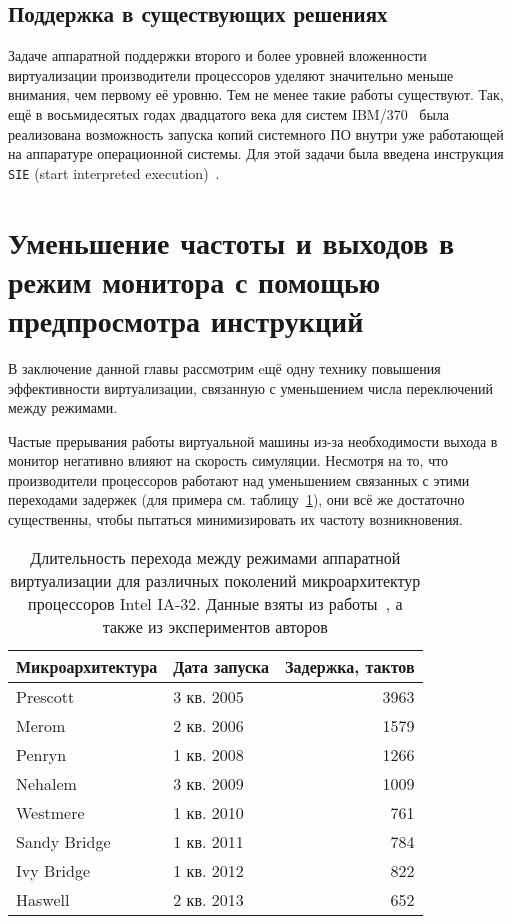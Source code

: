 \subsection{Поддержка в существующих решениях}

Задаче аппаратной поддержки второго и более уровней вложенности виртуализации производители процессоров уделяют значительно меньше внимания, чем первому её уровню. Тем не менее такие работы существуют. Так, ещё в восьмидесятых годах двадцатого века для систем IBM/370~\cite{Osisek:1991:EIA:106229.120150} была реализована возможность запуска копий системного ПО внутри уже работающей на аппаратуре операционной системы. Для этой задачи была введена инструкция \texttt{SIE} (\abbr start interpreted execution)~\cite{sie-comp-arch}.

\section[Уменьшение частоты и выходов в монитор]{Уменьшение частоты и выходов в режим монитора с помощью предпросмотра инструкций}\label{sec:software-prescan}

В заключение данной главы рассмотрим eщё одну технику повышения эффективности виртуализации, связанную с уменьшением числа переключений между режимами.

Частые прерывания работы виртуальной машины из-за необходимости выхода в монитор негативно влияют на скорость симуляции.  Несмотря на то, что производители процессоров работают над уменьшением связанных с этими переходами задержек (для примера см. таблицу~\ref{tab:vmexit-latency}), они всё же достаточно существенны, чтобы пытаться минимизировать их частоту возникновения.

\begin{table}[htb]
\centering
\begin{tabular}{|l|l|r|}\hline
\textbf{Микроархитектура} & \textbf{Дата запуска} & \textbf{Задержка, тактов} \\\hline
Prescott     & 3 кв. 2005 & 3963 \\\hline
Merom        & 2 кв. 2006 & 1579 \\\hline
Penryn       & 1 кв. 2008 & 1266 \\\hline
Nehalem      & 3 кв. 2009 & 1009 \\\hline
Westmere     & 1 кв. 2010 & 761 \\\hline
Sandy Bridge & 1 кв. 2011 & 784 \\\hline
Ivy Bridge   & 1 кв. 2012 & 822 \\\hline
Haswell      & 2 кв. 2013 & 652 \\\hline

\end{tabular}
\caption[Длительность перехода между режимами аппаратной виртуализации]{Длительность перехода между режимами аппаратной виртуализации для различных поколений микроархитектур процессоров Intel IA-32. Данные взяты из работы \cite{Agesen:2012:STA:2342821.2342856}, а также из экспериментов авторов}
\label{tab:vmexit-latency}
\end{table}

